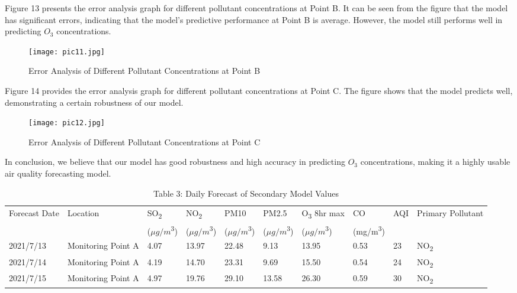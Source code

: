 \documentclass[12pt]{article}
\begin{document}
Figure 13 presents the error analysis graph for different pollutant concentrations at Point B. It can be seen from the figure that the model has significant errors, indicating that the model's predictive performance at Point B is average. However, the model still performs well in predicting $O_3$ concentrations.

\begin{figure}[H]
	\caption{Error Analysis of Different Pollutant Concentrations at Point B}
	\label{pic11}
	\centering
	\texttt{[image: pic11.jpg]}
\end{figure}

Figure 14 provides the error analysis graph for different pollutant concentrations at Point C. The figure shows that the model predicts well, demonstrating a certain robustness of our model.

\begin{figure}[H]
	\caption{Error Analysis of Different Pollutant Concentrations at Point C}
	\label{pic12}
	\centering
	\texttt{[image: pic12.jpg]}
\end{figure}

In conclusion, we believe that our model has good robustness and high accuracy in predicting $O_3$ concentrations, making it a highly usable air quality forecasting model.

\begin{table}[h!]
	\centering
	\begin{adjustbox}{width=1\textwidth}
	\begin{tabular}{llllllllll}
		\hline
		Forecast Date & Location & SO\textsubscript{2} & NO\textsubscript{2} & PM10 & PM2.5 & O\textsubscript{3} 8hr max & CO & AQI & Primary Pollutant \\
		& & ($\mu g/m$\textsuperscript{3}) & ($\mu g/m$\textsuperscript{3}) & ($\mu g/m$\textsuperscript{3}) & ($\mu g/m$\textsuperscript{3}) & ($\mu g/m$\textsuperscript{3}) & (mg/m\textsuperscript{3}) & & \\
		\hline
		2021/7/13 & Monitoring Point A & 4.07 & 13.97 & 22.48 & 9.13 & 13.95 & 0.53 & 23 & NO\textsubscript{2} \\
		2021/7/14 & Monitoring Point A & 4.19 & 14.70 & 23.31 & 9.69 & 15.50 & 0.54 & 24 & NO\textsubscript{2} \\
		2021/7/15 & Monitoring Point A & 4.97 & 19.76 & 29.10 & 13.58 & 26.30 & 0.59 & 30 & NO\textsubscript{2} \\
		\hline
	\end{tabular}
	\end{adjustbox}
	\caption{Table 3: Daily Forecast of Secondary Model Values}
	\label{tab:daily_forecast_secondary_model}
\end{table}
\end{document}
